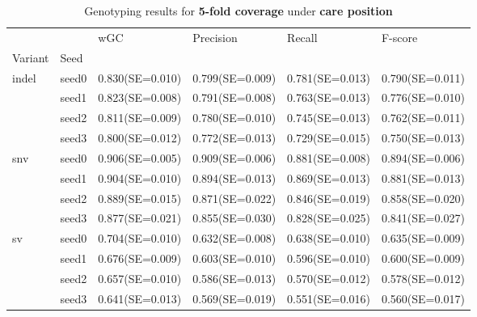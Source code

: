 \documentclass{PHlab-thesis}
\begin{document}
\begin{table}[ht!]
\begin{tabular*}{\textwidth}{@{\extracolsep{\fill}}llllll@{\extracolsep{\fill}}}
\toprule
   &         &               wGC &         Precision &            Recall &           F-score \\
Variant & Seed &                   &                   &                   &                   \\
\midrule
indel & seed0  & 0.830(SE=0.010)&  0.799(SE=0.009)&  0.781(SE=0.013)&  0.790(SE=0.011) \\
   & seed1 & 0.823(SE=0.008)&  0.791(SE=0.008)&  0.763(SE=0.013)&  0.776(SE=0.010)\\
   & seed2 & 0.811(SE=0.009)&  0.780(SE=0.010)&  0.745(SE=0.013) & 0.762(SE=0.011)\\
   & seed3 & 0.800(SE=0.012)&0.772(SE=0.013)& 0.729(SE=0.015)& 0.750(SE=0.013)\\
\midrule
snv & seed0  & 0.906(SE=0.005)&  0.909(SE=0.006)&  0.881(SE=0.008)&  0.894(SE=0.006) \\
   & seed1 &0.904(SE=0.010)&  0.894(SE=0.013)&  0.869(SE=0.013)&  0.881(SE=0.013)\\
   & seed2 & 0.889(SE=0.015)&  0.871(SE=0.022)&  0.846(SE=0.019) & 0.858(SE=0.020)\\
   & seed3 & 0.877(SE=0.021)& 0.855(SE=0.030)& 0.828(SE=0.025)& 0.841(SE=0.027)\\
\midrule
sv & seed0  & 0.704(SE=0.010)&  0.632(SE=0.008)&  0.638(SE=0.010) & 0.635(SE=0.009) \\
   & seed1 & 0.676(SE=0.009)&  0.603(SE=0.010)&  0.596(SE=0.010)&  0.600(SE=0.009)\\
   & seed2 & 0.657(SE=0.010)&  0.586(SE=0.013)&  0.570(SE=0.012)&  0.578(SE=0.012)\\
   & seed3 & 0.641(SE=0.013)& 0.569(SE=0.019)& 0.551(SE=0.016)& 0.560(SE=0.017)\\
\bottomrule
\end{tabular*}
\caption{Genotyping results for \textbf{5-fold coverage} under \textbf{care position} \label{table:care-5x}}
\end{table}
\end{document}
